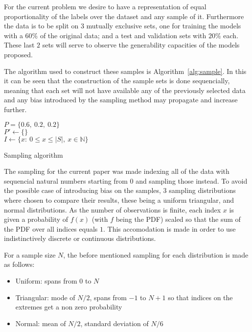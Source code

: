 \documentclass[conference]{IEEEtran}
\begin{document}
For the current problem we desire to have a representation
of equal proportionality of the labels over the dataset and any sample of it.
Furthermore the data is to be split on $3$ mutually exclusive sets, one for
training the models with a $60\%$ of the original data; and a test and validation
sets with $20\%$ each. These last $2$ sets will serve to observe the generability
capacities of the models proposed.

The algorithm used to construct these samples is Algorithm~\ref{alg:sample}.
In this it can be seen that the construction of the sample sets is done
sequencially, meaning that each set will not have available any of the previously
selected data and any bias introduced by the sampling method may propagate and
increase further.

\begin{algorithm}
    $P = \{0.6,\ 0.2,\ 0.2\}$\\
    $P' \gets \{\}$\\
    $I \gets \{x:\ 0\leq x\leq \lvert S\rvert,\ x\in\mathbb{N}\}$\\
    \caption{Sampling algorithm}\label{alg:sample}
\end{algorithm}

The sampling for the current paper was made indexing all of the data with
sequencial natural numbers starting from $0$ and sampling those instead.
To avoid the possible case of introducing bias on the samples, $3$ sampling
distributions where chosen to compare their results, these being a uniform
triangular, and normal distributions. As the number of observations is finite,
each index $x$ is given a probability of $f(x)$ (with $f$ being the PDF) 
scaled so that the sum of the PDF over all indices equals $1$. This accomodation
is made in order to use indistinctively discrete or continuous distributions.

For a sample size $N$, the before mentioned sampling for each distribution is
made as follows:
\begin{itemize}
    \item Uniform: spans from $0$ to $N$
    \item Triangular: mode of $N/2$, spans from $-1$ to $N+1$ so that indices
        on the extremes get a non zero probability
    \item Normal: mean of $N/2$, standard deviation of $N/6$
\end{itemize}
\end{document}

